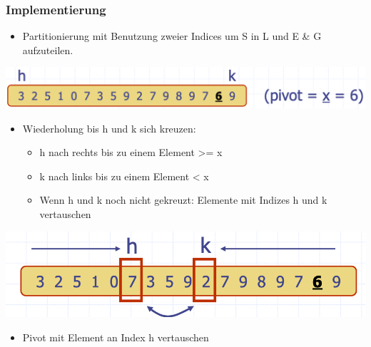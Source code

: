\subsubsection{Implementierung}
\begin{itemize}
    \item Partitionierung mit Benutzung zweier Indices um S in L und E \& G aufzuteilen.
\end{itemize}
\begin{center}
    \includegraphics[scale=.2]{graphic/05 QuickSort/In-Place1.png}
\end{center}
\begin{itemize}
    \item Wiederholung bis h und k sich kreuzen:
    \begin{itemize}
        \item h nach rechts bis zu einem Element >= x
        \item k nach links bis zu einem Element < x
        \item Wenn h und k noch nicht gekreuzt: Elemente mit Indizes h und k vertauschen
    \end{itemize}
\end{itemize}
\vspace{-8pt}
\begin{center}
    \includegraphics[scale=.2]{graphic/05 QuickSort/In-Place2.png}
\end{center}
\vspace{-8pt}
\begin{itemize}
    \item Pivot mit Element an Index h vertauschen
\end{itemize}



